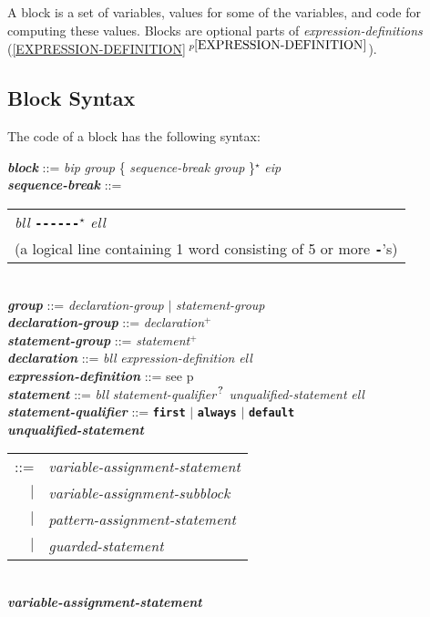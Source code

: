 \documentclass[12pt]{article}
\newcommand{\TT}[1]{{\tt \bfseries #1}}
\newcommand{\ttkey}[1]{{\tt \bfseries #1}}
\newcommand{\emkey}[1]{{\em \bfseries #1}}
\newcommand{\itemref}[1]{\ref{#1}$\,^{p\pageref{#1}}$}
\newcommand{\pagref}[1]{p\pageref{#1}}
\newcommand{\STAR}{{\Large $^\star$}}
\newcommand{\PLUS}[1][]{{$^{+#1}$}}
\newcommand{\QMARK}{{$^{\,\mbox{\footnotesize ?}}$}}
\newenvironment{indpar}[1][0.3in]%
	{\begin{list}{}%
		     {\setlength{\itemsep}{0in}%
		      \setlength{\topsep}{0in}%
		      \setlength{\parsep}{1ex}%
		      \setlength{\labelwidth}{#1}%
		      \setlength{\leftmargin}{#1}%
		      \addtolength{\leftmargin}{\labelsep}}%
	 \item}%
	{\end{list}}
\begin{document}
A block is a set of variables, values for some of the variables, and
code for computing these values.  Blocks are optional parts of
{\em expression-definitions} (\itemref{EXPRESSION-DEFINITION}).

\subsection{Block Syntax}
\label{BLOCK-SYNTAX}

The code of a block has the following syntax:

\begin{indpar}
\emkey{block} ::= {\em bip} {\em group}
                         \{ {\em sequence-break} {\em group} \}\STAR{}
			 {\em eip}
\\[1ex]
\emkey{sequence-break} ::=
    \begin{tabular}[t]{@{}l@{}}
    {\em bll} \ttkey{-{}-{}-{}-{}-}\TT{-}\STAR{} {\em ell} \\
    (a logical line containing 1 word
     consisting of 5 or more \TT{-}'s)
    \end{tabular}
\\[1ex]
\emkey{group} ::= {\em declaration-group} $|$ {\em statement-group}
			 \\[1ex]
\emkey{declaration-group}\label{DECLARATION-GROUP} ::= {\em declaration}\PLUS{}
\\[1ex]
\emkey{statement-group} ::= {\em statement}\PLUS{}
\\[1ex]
\emkey{declaration} ::= {\em bll} {\em expression-definition} {\em ell}
\\[1ex]
\emkey{expression-definition} ::= see \pagref{EXPRESSION-DEFINITION} \\[1ex]
\emkey{statement} ::=
    {\em bll} {\em statement-qualifier}\QMARK{} {\em unqualified-statement}
    {\em ell}
\label{STATEMENT}
\\[1ex]
\emkey{statement-qualifier} ::= \ttkey{first}
			    $|$ \ttkey{always}
			    $|$ \ttkey{default}
\\[1ex]
\emkey{unqualified-statement}
    \begin{tabular}[t]{rl}
    ::= & {\em variable-assignment-statement} \\
    $|$ & {\em variable-assignment-subblock} \\
    $|$ & {\em pattern-assignment-statement} \\
    $|$ & {\em guarded-statement}
    \end{tabular}
\\[1ex]
\emkey{variable-assignment-statement} \\

\end{indpar}
\end{document}
